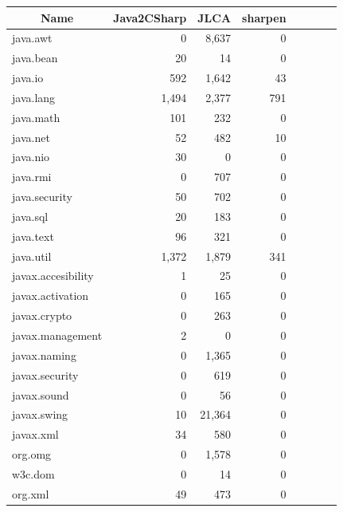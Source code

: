 \begin{table}[t]
\centering
\begin{SmallOut}
\begin {tabular} {|l|r|r|r|r|r|r|r|}
 \hline
\multicolumn{1}{|c}{\textbf{Name}}
& \multicolumn{1}{|c|}{\textbf{Java2CSharp}} & \multicolumn{1}{|c|}{\textbf{JLCA}}& \multicolumn{1}{|c|}{\textbf{sharpen}} \\
\hline
java.awt  &   0     &    8,637  &    0   \\
\hline
java.bean &   20    &    14     &    0    \\
\hline
java.io   &   592   &   1,642   &   43   \\
\hline
java.lang &   1,494  &   2,377   &   791  \\
\hline
java.math &    101   &    232    &   0    \\
\hline
java.net  &    52    &   482     &   10    \\
\hline
java.nio  &    30    &    0      &   0    \\
\hline
java.rmi  &    0     &    707   &    0   \\
\hline
java.security &  50  &    702    &  0    \\
\hline
java.sql   &   20   &     183   &   0   \\
\hline
java.text  &   96   &   321   &   0  \\
\hline
java.util  & 1,372  &   1,879   &   341   \\
\hline
javax.accesibility  &   1    &   25    &   0    \\
\hline
javax.activation     &  0    &   165   &   0     \\
\hline
javax.crypto        &   0    &    263  &    0    \\
\hline
javax.management   &   2    &    0     &   0     \\
\hline
javax.naming       &   0    &   1,365   &   0      \\
\hline
javax.security     &   0     &  619     &   0    \\
\hline
javax.sound          &   0    &   56    & 0     \\
\hline
javax.swing          &   10   &  21,364 &   0   \\
\hline
javax.xml            &   34   &   580   &   0  \\
\hline
org.omg              &   0    &  1,578  &   0    \\
\hline
w3c.dom              &   0    &   14    & 0   \\
\hline
org.xml             &    49   &   473    &  0   \\
\hline
\end{tabular}%
 \label{table:package}
\end{SmallOut}\vspace*{-6ex}
\end{table}
